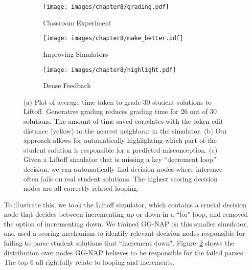 \begin{figure}[t!]
    \centering
    \begin{subfigure}{0.45\textwidth}
        \centering
        \texttt{[image: images/chapter8/grading.pdf]}
        \caption{Classroom Experiment}
        \label{fig:human_exp}
    \end{subfigure}
    \begin{subfigure}{0.49\textwidth}
        \centering
        \texttt{[image: images/chapter8/make\_better.pdf]}
        \caption{Improving Simulators}
        \label{fig:make_better}
    \end{subfigure}
     \begin{subfigure}{0.8\textwidth}
        \centering
        \texttt{[image: images/chapter8/highlight.pdf]}
        \caption{Dense Feedback}
        \label{fig:code_highlight}
    \end{subfigure}
    
    \caption{ (a) Plot of average time taken to grade 30 student solutions to Liftoff. Generative grading reduces grading time for 26 out of 30 solutions. The amount of time saved correlates with the token edit distance (yellow) to the nearest neighbour in the simulator. (b) Our approach allows for automatically highlighting which part of the student solution is responsible for a predicted misconception. (c) Given a Liftoff simulator that is missing a key ``decrement loop'' decision, we can automatically find decision nodes where inference often fails on real student solutions.  The highest scoring decision nodes are all correctly related looping.}
\end{figure}

To illustrate this, we took the Liftoff simulator, which contains a crucial decision node that decides between incrementing up or down in a ``for" loop, and removed the option of incrementing down. We trained GG-NAP on this smaller simulator, and used a scoring mechanism to identify relevant decision nodes responsible for failing to parse student solutions that ``increment down". Figure~\ref{fig:make_better} shows the distribution over nodes GG-NAP believes to be responsible for the failed parses. The top 6 all rightfully relate to looping and increments.

